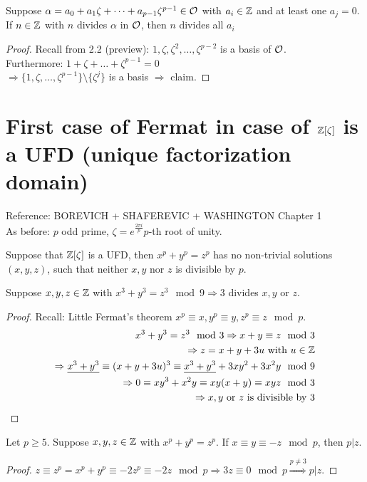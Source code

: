 \begin{Bem}
Suppose $\alpha = a_0 + a_1 \zeta + \dots + a_{p-1}\zeta^{p-1} \in \mathcal{O}$ with $a_i \in \mathbb{Z}$ and at least one $a_j =0$.\\
If $n \in \mathbb{Z}$ with $n$ divides $\alpha$ in $\mathcal{O}$, then $n$ divides all $a_i$
\end{Bem}
\begin{proof}
Recall from 2.2 (preview): $1, \zeta, \zeta^2, \dots, \zeta^{p-2}$ is a basis of $\mathcal{O}$.\\
Furthermore: $1+\zeta+\dots+\zeta^{p-1}=0$\\
$\Rightarrow \{1, \zeta, \dots, \zeta^{p-1}\} \setminus \{\zeta^j\}$ is a basis $\Rightarrow$ claim.
\end{proof}

\section{First case of Fermat in case of $\mathbb{Z}[\zeta]$ is a UFD (unique factorization domain)}
Reference: BOREVICH + SHAFEREVIC + WASHINGTON Chapter 1\\
As before: $p$ odd prime, $\zeta= e^{\frac{2 \pi i}{p}} p$-th root of unity.

\begin{Satz}
Suppose that $\mathbb{Z}[\zeta]$ is a UFD, then $x^p+y^p=z^p$ has no non-trivial solutions $(x,y,z)$, such that neither $x,y$ nor $z$ is divisible by $p$.
\end{Satz}


\begin{Satz}[$p=3$]
Suppose $x,y,z \in \mathbb{Z}$ with $x^3+y^3=z^3 \mod 9 \Rightarrow 3$ divides $x,y$ or $z$.
\end{Satz}
\begin{proof}
Recall: Little Fermat's theorem $x^p \equiv x, y^p \equiv y, z^p\equiv z \mod p$.
\begin{align*}
x^3+y^3=z^3 \mod 3 \Rightarrow x+y \equiv z \mod 3\\
\Rightarrow z=x+y+3u \text{ with } u \in \mathbb{Z}\\
\Rightarrow \underline{x^3+y^3} \equiv (x+y+3u)^3 \equiv \underline{x^3+y^3}+3xy^2+3x^2y \mod 9\\
\Rightarrow 0 \equiv xy^3+x^2y \equiv xy(x+y) \equiv xyz \mod 3\\
\Rightarrow x,y \text{ or } z \text{ is divisible by } 3
\end{align*}
\end{proof}

\begin{Lem}
Let $p \geq 5$. Suppose $x,y,z \in \mathbb{Z}$ with $x^p+y^p=z^p$. If $x\equiv y \equiv -z \mod p$, then $p | z$.
\end{Lem}
\begin{proof}
$z \equiv z^p = x^p+y^p \equiv -2z^p \equiv -2z \mod p \Rightarrow 3z \equiv 0 \mod p \stackrel{p \neq 3}{\Longrightarrow} p | z$.
\end{proof}

